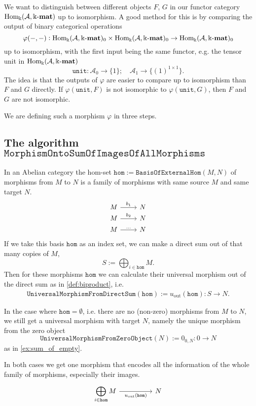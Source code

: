 
We want to distinguish between different objects $F$, $G$ in our functor category $\mathrm{Hom_{\Bbbk}}(\mathcal{A},\Bbbk\textnormal{-}\mathbf{mat})$ up to isomorphism. A good method for this is by
comparing the output of binary categorical operations
\[
\varphi( -, - ) : \mathrm{Hom_{\Bbbk}}(\mathcal{A},\Bbbk\textnormal{-}\mathbf{mat})_{0} \times \mathrm{Hom_{\Bbbk}}(\mathcal{A},\Bbbk\textnormal{-}\mathbf{mat})_{0} \rightarrow \mathrm{Hom_{\Bbbk}}(\mathcal{A},\Bbbk\textnormal{-}\mathbf{mat})_{0}
\]
up to isomorphism, with the first input being the same functor, e.g. the tensor unit in $\mathrm{Hom_{\Bbbk}}(\mathcal{A},\Bbbk\textnormal{-}\mathbf{mat})$
\[
\mathtt{unit} : \mathcal{A}_{0} \rightarrow \{1\};\quad \mathcal{A}_{1} \rightarrow \{(1)^{1\times 1}\}.
\]
The idea is that the outputs of $\varphi$ are easier to compare up to isomorphism than $F$ and $G$ directly.
If $\varphi( \mathtt{unit}, F )$ is not isomorphic to $\varphi( \mathtt{unit}, G )$, then $F$ and $G$ are not isomorphic.

We are defining such a morphism $\varphi$ in three steps.

\subsection{The algorithm $\mathtt{MorphismOntoSumOfImagesOfAllMorphisms}$}

In an Abelian category the hom-set $\mathtt{hom} := \mathtt{BasisOfExternalHom}( M, N )$ of morphisms from $M$ to $N$ is a family of
morphisms with same source $M$ and same target $N$.
\[
\begin{tikzcd}[
  row sep=0.5ex,
]
M \arrow[r, "b_{1}"] & N \\
M \arrow[r, "b_{2}"] & N \\
M \arrow[r, "\dots"] & N
\end{tikzcd}
\]
If we take this basis $\mathtt{hom}$ as an index set, we can make a direct sum out of that many copies of $M$,
\[
S := \bigoplus_{i\in \mathtt{hom}} M.
\]
Then for these morphisms $\mathtt{hom}$ we can calculate their universal morphism out of the direct sum as in \ref{def:biproduct}, i.e.
\begin{align*}
\mathtt{UniversalMorphismFromDirectSum}( \mathtt{hom} ) := u_{\text{out}}(\mathtt{hom}) : S \rightarrow N.
\end{align*}

In the case where $\mathtt{hom} = \emptyset$, i.e. there are no (non-zero) morphisms from $M$ to $N$, we still get a
universal morphism with target $N$, namely the unique morphism from the zero object
\[
\mathtt{UniversalMorphismFromZeroObject}( N ) := 0_{0,N} : 0 \rightarrow N
\]
as in \ref{ex:sum_of_empty}.

In both cases we get one morphism that encodes all the information of the whole family of morphisms, especially their images. 
\[
\begin{tikzcd}
\displaystyle{\bigoplus_{i\in \mathtt{hom}}M} \arrow[rr, "u_{\text{out}}(\mathtt{hom})"'] &                              & N
\end{tikzcd}
\]

